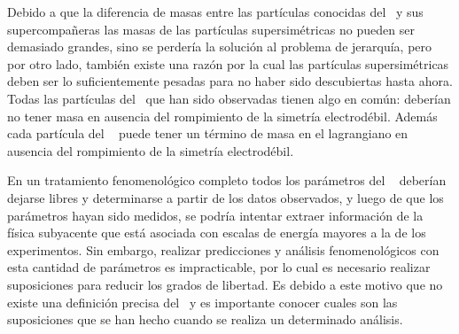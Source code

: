 Debido a que la diferencia de masas entre las partículas conocidas del \ME ~y sus supercompañeras las masas de las partículas supersimétricas no pueden ser demasiado grandes, sino se perdería la solución al problema de jerarquía, pero por otro lado, también existe una razón por la cual las partículas supersimétricas deben ser lo suficientemente pesadas para no haber sido descubiertas hasta ahora. Todas las partículas del \MSSM ~que han sido observadas tienen algo en común: deberían no tener masa en ausencia del rompimiento de la simetría electrodébil. %
Además cada partícula del \MSSM ~ puede tener un término de masa en el lagrangiano en ausencia del rompimiento de la simetría electrodébil.

En un tratamiento fenomenológico completo todos los parámetros del \MSSM~ deberían dejarse libres y determinarse a partir de los datos observados, y luego de que los parámetros hayan sido medidos, se podría intentar extraer información de la física subyacente que está asociada con escalas de energía mayores a la de los experimentos. Sin embargo, realizar predicciones y análisis fenomenológicos con esta cantidad de parámetros es impracticable, por lo cual es necesario realizar suposiciones para reducir los grados de libertad. Es debido a este motivo que no existe una definición precisa del \MSSM ~y es importante conocer cuales son las suposiciones que se han hecho cuando se realiza un determinado análisis.

